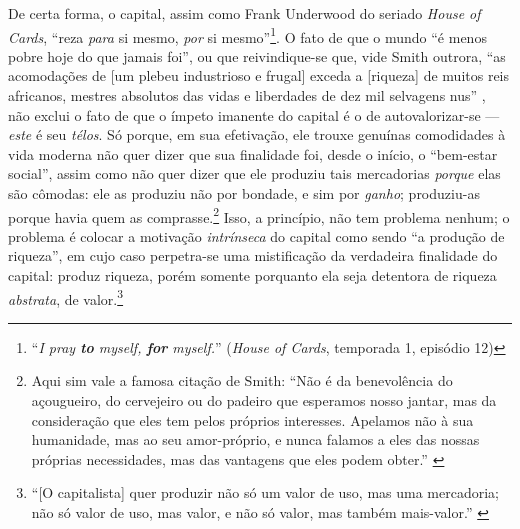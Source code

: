 \documentclass[12pt]{article}
\numberwithin{equation}{section}
\theoremstyle{plain}
\theoremstyle{definition}
\theoremstyle{remark}
\begin{document}
De certa forma, o capital, assim como Frank Underwood do seriado \textit{House of Cards}, ``reza \textit{para} si mesmo, \textit{por} si mesmo''\footnote{``\textit{I pray \textbf{to} myself, \textbf{for} myself.}'' (\textit{House of Cards}, temporada 1, episódio 12)}. O fato de que o mundo ``é menos pobre hoje do que jamais foi'', ou que reivindique-se que, vide Smith outrora, ``as acomodações de [um plebeu industrioso e frugal] exceda a [riqueza] de muitos reis africanos, mestres absolutos das vidas e liberdades de dez mil selvagens nus'' \parencite[p. 41]{Smith1904}, não exclui o fato de que o ímpeto imanente do capital é o de autovalorizar-se --- \textit{este} é seu \textit{télos}. Só porque, em sua efetivação, ele trouxe genuínas comodidades à vida moderna não quer dizer que sua finalidade foi, desde o início, o ``bem-estar social'', assim como não quer dizer que ele produziu tais mercadorias \textit{porque} elas são cômodas: ele as produziu não por bondade, e sim por \textit{ganho}; produziu-as porque havia quem as comprasse.\footnote{Aqui sim vale a famosa citação de Smith: ``Não é da benevolência do açougueiro, do cervejeiro ou do padeiro que esperamos nosso jantar, mas da consideração que eles tem pelos próprios interesses. Apelamos não à sua humanidade, mas ao seu amor-próprio, e nunca falamos a eles das nossas próprias necessidades, mas das vantagens que eles podem obter.'' \parencite[p. 28]{Smith1904}} Isso, a princípio, não tem problema nenhum; o problema é colocar a motivação \textit{intrínseca} do capital como sendo ``a produção de riqueza'', em cujo caso perpetra-se uma mistificação da verdadeira finalidade do capital: produz riqueza, porém somente porquanto ela seja detentora de riqueza \textit{abstrata}, de valor.\footnote{``[O capitalista] quer produzir não só um valor de uso, mas uma mercadoria; não só valor de uso, mas valor, e não só valor, mas também mais-valor.'' \parencite[p. 263]{Marx2017}}




\end{document}
